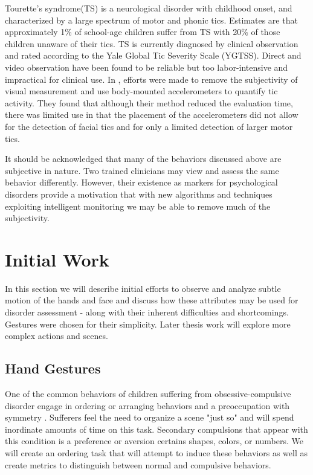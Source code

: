 \documentclass[11pt]{article}
\begin{document}
Tourette's syndrome(TS) is a neurological disorder with childhood onset, and characterized by a large spectrum of motor and phonic tics. Estimates are that approximately 1\% of school-age children suffer from TS with 20\% of those children unaware of their tics. TS is currently diagnosed by clinical observation and rated according to the Yale Global Tic Severity Scale (YGTSS). Direct and video observation have been found to be reliable \cite{walkup1992} but too labor-intensive and impractical for clinical use. In \cite{bernabei2010}, efforts were made to remove the subjectivity of visual measurement and use  body-mounted accelerometers to quantify tic activity. They found that although their method reduced the evaluation time, there was limited use in that the placement of the accelerometers did not allow for the detection of facial tics and for only a limited detection of larger motor tics.

It should be acknowledged that many of the behaviors discussed above are subjective in nature. Two trained clinicians may view and assess the same behavior differently. However, their existence as markers for psychological disorders provide a motivation that with new algorithms and techniques exploiting intelligent monitoring we may be able to remove much of the subjectivity.

\section{Initial Work}
In this section we will describe initial efforts to observe and analyze subtle motion of the hands and face and discuss how these attributes may be used for disorder assessment - along with their inherent difficulties and shortcomings. Gestures were chosen for their simplicity. Later thesis work will explore more complex actions and scenes.
\subsection{Hand Gestures}
One of the common behaviors of children suffering from obsessive-compulsive disorder engage in ordering or arranging behaviors and a preoccupation with symmetry \cite{radomsky2004}. Sufferers feel the need to organize a scene "just so" and will spend inordinate amounts of time on this task. Secondary compulsions that appear with this condition is a preference or aversion certains shapes, colors, or numbers. We will create an ordering task that will attempt to induce these behaviors as well as create metrics to distinguish between normal and compulsive behaviors.
\end{document}
